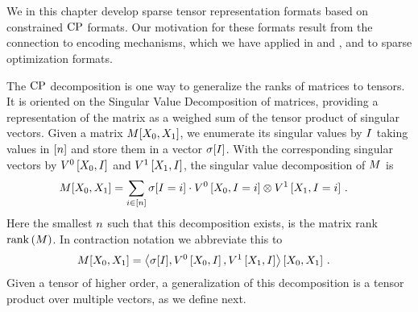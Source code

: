 \chapter{\chatextsparseCalculus}\label{cha:sparseCalculus}

We in this chapter develop sparse tensor representation formats based on constrained $\mathrm{CP}$ formats.
Our motivation for these formats result from the connection to encoding mechanisms, which we have applied in  and , and to sparse optimization formats.



The $\mathrm{CP}$ decomposition is one way to generalize the ranks of matrices to tensors.
It is oriented on the Singular Value Decomposition of matrices, providing a representation of the matrix as a weighed sum of the tensor product of singular vectors.
Given a matrix $M[X_{0},X_{1}]$, we enumerate its singular values by $I$ taking values in $[n]$ and store them in a vector $\sigma[I]$.
With the corresponding singular vectors by $V^{0}\left[X_{0},I\right]$ and $V^{1}\left[X_{1},I\right]$, the singular value decomposition of $M$ is
\begin{align*}
    M[X_{0},X_{1}]
    &= \sum_{i\in[n]} \sigma[I=i] \cdot V^{0}\left[X_{0},I=i\right] \otimes V^{1}\left[X_{1},I=i\right] \, .
\end{align*}
Here the smallest $n$ such that this decomposition exists, is the matrix rank $\mathrm{rank}\left(M\right)$.
In contraction notation we abbreviate this to
\begin{align*}
    M[X_{0},X_{1}]
    &= \left\langle \sigma[I],V^{0}\left[X_{0},I\right],V^{1}\left[X_{1},I\right]\right\rangle \left[ X_{0},X_{1} \right] \, .
\end{align*}
Given a tensor of higher order, a generalization of this decomposition is a tensor product over multiple vectors, as we define next.


